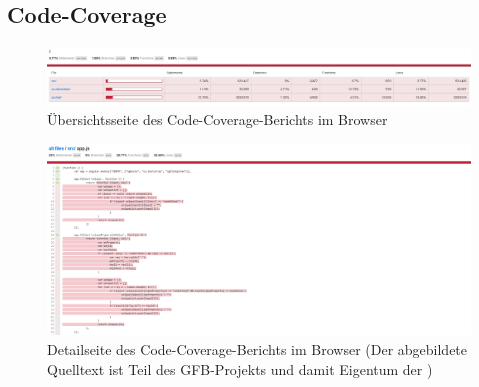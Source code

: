 \subsection{Code-Coverage}
\begin{figure}[H]
	\includegraphics[width=\textwidth]{abb/code-cov-1.png}
	\caption{Übersichtsseite des Code-Coverage-Berichts im Browser}
	\label{abb:code-cov-1}
\end{figure}

\begin{figure}[H]
	\includegraphics[width=\textwidth]{abb/code-cov-2.png}
	\caption[Detailseite des Code-Coverage-Berichts im Browser]{Detailseite des Code-Coverage-Berichts im Browser (Der abgebildete Quelltext ist Teil des GFB-Projekts und damit Eigentum der \domain)}
	\label{abb:code-cov-2}
\end{figure}